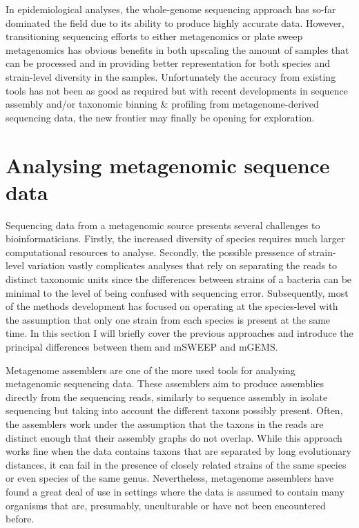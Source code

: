 \documentclass[officiallayout]{tktla}
\begin{document}
In epidemiological analyses, the whole-genome sequencing approach has
so-far dominated the field due to its ability to produce highly
accurate data. However, transitioning sequencing efforts to either
metagenomics or plate sweep metagenomics has obvious benefits in both
upscaling the amount of samples that can be processed and in providing
better representation for both species and strain-level diversity in
the samples. Unfortunately the accuracy from existing tools has not
been as good as required but with recent developments in sequence
assembly and/or taxonomic binning \& profiling from metagenome-derived
sequencing data, the new frontier may finally be opening for
exploration.

\section{Analysing metagenomic sequence data}

Sequencing data from a metagenomic source presents several challenges
to bioinformaticians. Firstly, the increased diversity of species
requires much larger computational resources to analyse. Secondly, the
possible pressence of strain-level variation vastly complicates
analyses that rely on separating the reads to distinct taxonomic units
since the differences between strains of a bacteria can be minimal to
the level of being confused with sequencing error. Subsequently, most
of the methods development has focused on operating at the
species-level with the assumption that only one strain from each
species is present at the same time. In this section I will briefly
cover the previous approaches and introduce the principal differences
between them and mSWEEP and mGEMS.

Metagenome assemblers are one of the more used tools for analysing
metagenomic sequencing data. These assemblers aim to produce
assemblies directly from the sequencing reads, similarly to sequence
assembly in isolate sequencing but taking into account the different
taxons possibly present. Often, the assemblers work under the
assumption that the taxons in the reads are distinct enough that their
assembly graphs do not overlap. While this approach works fine when
the data contains taxons that are separated by long evolutionary
distances, it can fail in the presence of closely related strains of
the same species or even species of the same genus. Nevertheless,
metagenome assemblers have found a great deal of use in settings where
the data is assumed to contain many organisms that are, presumably,
unculturable or have not been encountered before.
\end{document}
